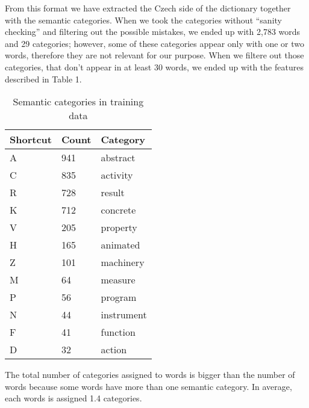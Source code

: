 \documentclass[letterpaper]{article}
\newcommand{\todofn}[1] {
 \footnote{\textbf{TODO : #1}}}
\begin{document}
From this format we have extracted the Czech side of the dictionary together with the semantic categories. 
When we took the categories without ``sanity checking'' and filtering out the possible mistakes, 
we ended up with 2,783 words and 29 categories; however, some of these categories appear only with one or two words, therefore they are not relevant for our purpose. When we filtere out those categories, that don't appear in at least 30 words, we ended up with the features described in Table 1.

\begin{table}
\begin{tabular}{|l|l|l|}
 \hline
\textbf{Shortcut} &  \textbf{Count} & \textbf{Category}\\
\hline
A & 941 & abstract \\ \hline
C & 835 & activity \\ \hline
R & 728 & result \\ \hline
K & 712 & concrete \\ \hline
V & 205 & property \\ \hline
H & 165 & animated \\ \hline
Z & 101 & machinery \\ \hline
M & 64 & measure\\ \hline
P & 56 & program \\ \hline
N & 44 & instrument \\ \hline
F & 41 & function \\ \hline
D & 32 & action \\ \hline

\end{tabular}
\caption{Semantic categories in training data}
\end{table}


The total number of categories assigned to words is bigger than the number of words because some words have more than one semantic category. In average, each words is assigned 1.4 categories.


\end{document}
